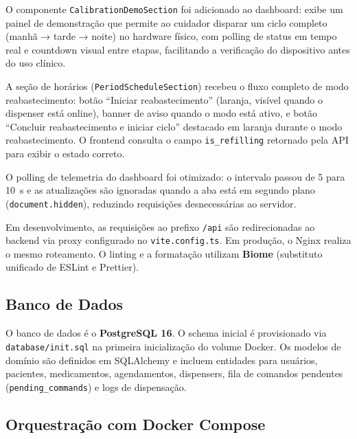 \documentclass[12pt,a4paper]{article}
\begin{document}
O componente \texttt{CalibrationDemoSection} foi adicionado ao dashboard: exibe um painel de demonstração que permite ao cuidador disparar um ciclo completo (manhã → tarde → noite) no hardware físico, com polling de status em tempo real e countdown visual entre etapas, facilitando a verificação do dispositivo antes do uso clínico.

A seção de horários (\texttt{PeriodScheduleSection}) recebeu o fluxo completo de modo reabastecimento: botão ``Iniciar reabastecimento'' (laranja, visível quando o dispenser está online), banner de aviso quando o modo está ativo, e botão ``Concluir reabastecimento e iniciar ciclo'' destacado em laranja durante o modo reabastecimento. O frontend consulta o campo \texttt{is\_refilling} retornado pela API para exibir o estado correto.

O polling de telemetria do dashboard foi otimizado: o intervalo passou de 5 para 10~s e as atualizações são ignoradas quando a aba está em segundo plano (\texttt{document.hidden}), reduzindo requisições desnecessárias ao servidor.

Em desenvolvimento, as requisições ao prefixo \texttt{/api} são redirecionadas ao backend via proxy configurado no \texttt{vite.config.ts}. Em produção, o Nginx realiza o mesmo roteamento. O linting e a formatação utilizam \textbf{Biome} (substituto unificado de ESLint e Prettier).

\subsection{Banco de Dados}

O banco de dados é o \textbf{PostgreSQL 16}. O schema inicial é provisionado via \texttt{database/\allowbreak init.sql} na primeira inicialização do volume Docker. Os modelos de domínio são definidos em SQLAlchemy e incluem entidades para usuários, pacientes, medicamentos, agendamentos, dispensers, fila de comandos pendentes (\texttt{pending\_commands}) e logs de dispensação.

\subsection{Orquestração com Docker Compose}
\end{document}
